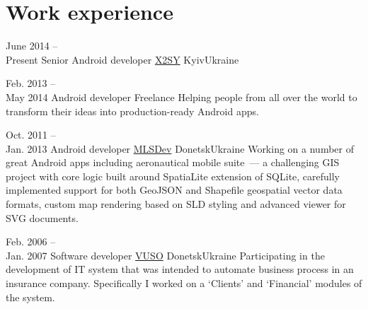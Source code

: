 \medskip
\section{Work experience}

\cventry
    {June 2014 --\\Present}
    {Senior Android developer}
    {\href{http://x2sy.com/}{X2SY}}
    {Kyiv}{Ukraine}
    {
        \iftoggle{is_nda_compliant}
            {
                Building Android app with advanced media playback features for
                an industry-leading local OTT service.\newline
            }
            {
                Building a set of mobile and TV user-friendly Android apps with 
				advanced media playback features for 
				\href{http://megogo.net/}{MEGOGO.NET}~--- an industry-leading 
                local OTT service.
                Working on the implementation of the proprietary VAST-compliant 
				media player which supports video content protected with 
				Widevine Classic DRM, HLS and MPEG-DASH adaptive playbacks, as 
				well as different types of video ads.\newline
            }
    }

\cventry
    {Feb. 2013 --\\May 2014}
    {Android developer}
    {Freelance}
    {}{}
    {Helping people from all over the world to transform their ideas into 
    production-ready Android apps.\newline}

\cventry
    {Oct. 2011 --\\Jan. 2013}
    {Android developer}
    {\href{http://mlsdev.com/}{MLSDev}}
    {Donetsk}{Ukraine}
    {Working on a number of great Android apps including aeronautical mobile 
    suite~--- a challenging GIS project with core logic built around SpatiaLite 
    extension of SQLite, carefully implemented support for both GeoJSON and 
    Shapefile geospatial vector data formats, custom map rendering based on SLD 
    styling and advanced viewer for SVG documents.\newline}

\cventry
    {Feb. 2006 --\\Jan. 2007}
    {Software developer}
    {\href{http://vuso.ua/}{VUSO}}
    {Donetsk}{Ukraine}
    {Participating in the development of IT system that was intended to 
    automate business process in an insurance company. Specifically I worked on 
    a `Clients' and `Financial' modules of the system.}


